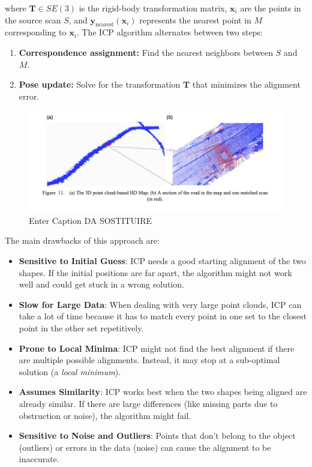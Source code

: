 where \( \mathbf{T} \in SE(3) \) is the rigid-body transformation matrix, \( \mathbf{x}_i \) are the points in the source scan \( S \), and \( \mathbf{y}_{\text{nearest}}(\mathbf{x}_i) \) represents the nearest point in \( M \) corresponding to \( \mathbf{x}_i \). 
The ICP algorithm alternates between two steps:
\begin{enumerate}
    \item \textbf{Correspondence assignment:} Find the nearest neighbors between \( S \) and \( M \).
    \item \textbf{Pose update:} Solve for the transformation \( \mathbf{T} \) that minimizes the alignment error.
\end{enumerate}
\begin{figure}[H]
    \centering
    \includegraphics[width=1\linewidth]{LateX//figs/ICP.png}
    \caption{Enter Caption DA SOSTITUIRE}
    \label{fig:enter-label}
\end{figure}
The main drawbacks of this approach are:
\begin{itemize}
    \item \textbf{Sensitive to Initial Guess}: ICP needs a good starting alignment of the two shapes. If the initial positions are far apart, the algorithm might not work well and could get stuck in a wrong solution.
    \item \textbf{Slow for Large Data}: When dealing with very large point clouds, ICP can take a lot of time because it has to match every point in one set to the closest point in the other set repetitively.
    \item \textbf{Prone to Local Minima}: ICP might not find the best alignment if there are multiple possible alignments. Instead, it may stop at a sub-optimal solution (a \textit{local minimum}).
    \item \textbf{Assumes Similarity}: ICP works best when the two shapes being aligned are already similar. If there are large differences (like missing parts due to obstruction or noise), the algorithm might fail.
    \item \textbf{Sensitive to Noise and Outliers}: Points that don’t belong to the object (outliers) or errors in the data (noise) can cause the alignment to be inaccurate.
\end{itemize}


